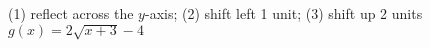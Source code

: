 {(1) reflect across the $y$-axis;  (2) shift left 1 unit;  (3) shift up 2 units}
{$g(x) = 2\sqrt{x+3} - 4$}